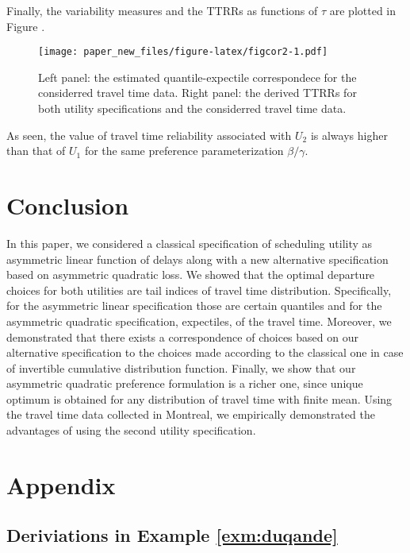 \documentclass[
]{article}
\theoremstyle{definition}
\theoremstyle{definition}
\theoremstyle{definition}
\theoremstyle{definition}
\theoremstyle{remark}
\begin{document}
Finally, the variability measures and the TTRRs as functions of \(\tau\) are plotted in Figure .

\begin{figure}
\centering
\texttt{[image: paper\_new\_files/figure-latex/figcor2-1.pdf]}
\caption{\label{fig:figcor2}Left panel: the estimated quantile-expectile correspondece for the considerred travel time data. Right panel: the derived TTRRs for both utility specifications and the considerred travel time data.}
\end{figure}

As seen, the value of travel time reliability associated with \(U_2\) is always higher than that of \(U_1\) for the same preference parameterization \(\beta/\gamma\).

\hypertarget{conclusion}{%
\section{Conclusion}\label{conclusion}}

In this paper, we considered a classical specification of scheduling utility as asymmetric linear function of delays along with a new alternative specification based on asymmetric quadratic loss. We showed that the optimal departure choices for both utilities are tail indices of travel time distribution. Specifically, for the asymmetric linear specification those are certain quantiles and for the asymmetric quadratic specification, expectiles, of the travel time. Moreover, we demonstrated that there exists a correspondence of choices based on our alternative specification to the choices made according to the classical one in case of invertible cumulative distribution function. Finally, we show that our asymmetric quadratic preference formulation is a richer one, since unique optimum is obtained for any distribution of travel time with finite mean. Using the travel time data collected in Montreal, we empirically demonstrated the advantages of using the second utility specification.

\hypertarget{appendix}{%
\section{Appendix}\label{appendix}}

\hypertarget{deriviations-in-example-refexmduqande}{%
\subsection{Deriviations in Example \ref{exm:duqande}}\label{deriviations-in-example-refexmduqande}}
\end{document}

